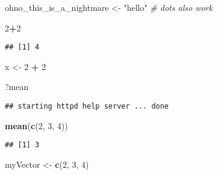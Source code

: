 \documentclass[
]{article}
\newenvironment{Shaded}{\begin{snugshade}}{\end{snugshade}}
\newcommand{\CommentTok}[1]{\textcolor[rgb]{0.56,0.35,0.01}{\textit{#1}}}
\newcommand{\DecValTok}[1]{\textcolor[rgb]{0.00,0.00,0.81}{#1}}
\newcommand{\FunctionTok}[1]{\textcolor[rgb]{0.13,0.29,0.53}{\textbf{#1}}}
\newcommand{\NormalTok}[1]{#1}
\newcommand{\OtherTok}[1]{\textcolor[rgb]{0.56,0.35,0.01}{#1}}
\newcommand{\SpecialCharTok}[1]{\textcolor[rgb]{0.81,0.36,0.00}{\textbf{#1}}}
\newcommand{\StringTok}[1]{\textcolor[rgb]{0.31,0.60,0.02}{#1}}
\begin{document}
\begin{Shaded}
\begin{Highlighting}[]
\NormalTok{ohno\_this\_is\_a\_nightmare }\OtherTok{\textless{}{-}} \StringTok{"hello"}
\CommentTok{\# dots also work}
\end{Highlighting}
\end{Shaded}

\begin{Shaded}
\begin{Highlighting}[]
\DecValTok{2}\SpecialCharTok{+}\DecValTok{2}
\end{Highlighting}
\end{Shaded}

\begin{verbatim}
## [1] 4
\end{verbatim}

\begin{Shaded}
\begin{Highlighting}[]
\NormalTok{x }\OtherTok{\textless{}{-}} \DecValTok{2} \SpecialCharTok{+} \DecValTok{2}
\end{Highlighting}
\end{Shaded}

\begin{Shaded}
\begin{Highlighting}[]
\NormalTok{?mean}
\end{Highlighting}
\end{Shaded}

\begin{verbatim}
## starting httpd help server ... done
\end{verbatim}

\begin{Shaded}
\begin{Highlighting}[]
\FunctionTok{mean}\NormalTok{(}\FunctionTok{c}\NormalTok{(}\DecValTok{2}\NormalTok{, }\DecValTok{3}\NormalTok{, }\DecValTok{4}\NormalTok{))}
\end{Highlighting}
\end{Shaded}

\begin{verbatim}
## [1] 3
\end{verbatim}

\begin{Shaded}
\begin{Highlighting}[]
\NormalTok{myVector }\OtherTok{\textless{}{-}} \FunctionTok{c}\NormalTok{(}\DecValTok{2}\NormalTok{, }\DecValTok{3}\NormalTok{, }\DecValTok{4}\NormalTok{)}
\end{Highlighting}
\end{Shaded}
\end{document}

